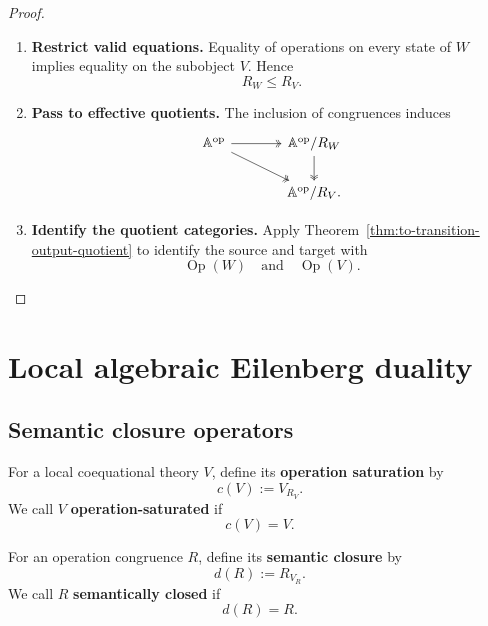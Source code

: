 \begin{proof}
    \leavevmode
    \begin{enumerate}
        \item \textbf{Restrict valid equations.}
        Equality of operations on every state of \(W\) implies equality on
        the subobject \(V\). Hence
        \[
            R_W\leq R_V.
        \]

        \item \textbf{Pass to effective quotients.}
        The inclusion of congruences induces
        \[
        \begin{tikzcd}[column sep=large]
            \mathbb A^{\mathrm{op}}
                \arrow[r, two heads]
                \arrow[dr, two heads]
            &
            \mathbb A^{\mathrm{op}}/R_W
                \arrow[d, two heads]
            \\
            &
            \mathbb A^{\mathrm{op}}/R_V.
        \end{tikzcd}
        \]

        \item \textbf{Identify the quotient categories.}
        Apply Theorem~\ref{thm:to-transition-output-quotient} to identify the
        source and target with
        \[
            \operatorname{Op}(W)
            \quad\text{and}\quad
            \operatorname{Op}(V).
        \]
    \end{enumerate}
\end{proof}

\section{Local algebraic Eilenberg duality}
\label{sec:to-local-algebraic-eilenberg}

\subsection{Semantic closure operators}
\label{subsec:to-semantic-closure-operators}

\begin{definition}
\label{def:to-saturation-semantic-closure}
    For a local coequational theory \(V\), define its
    \textbf{operation saturation} by
    \[
        c(V):=V_{R_V}.
    \]
    We call \(V\) \textbf{operation-saturated} if
    \[
        c(V)=V.
    \]

    For an operation congruence \(R\), define its
    \textbf{semantic closure} by
    \[
        d(R):=R_{V_R}.
    \]
    We call \(R\) \textbf{semantically closed} if
    \[
        d(R)=R.
    \]
\end{definition}

